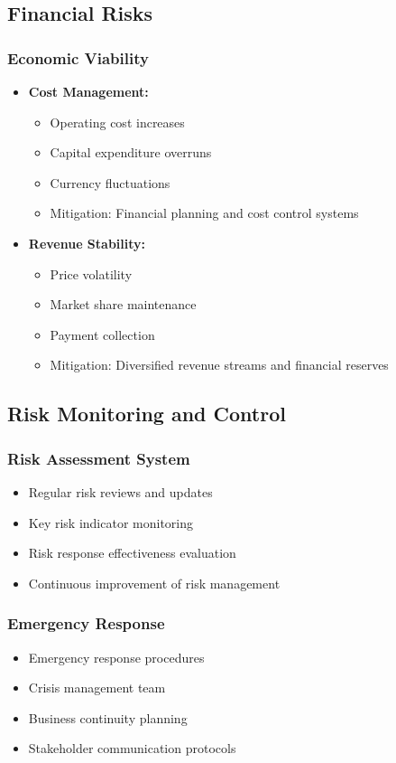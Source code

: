\subsection{Financial Risks}

\subsubsection{Economic Viability}
\begin{itemize}
    \item \textbf{Cost Management:}
    \begin{itemize}
        \item Operating cost increases
        \item Capital expenditure overruns
        \item Currency fluctuations
        \item Mitigation: Financial planning and cost control systems
    \end{itemize}
    
    \item \textbf{Revenue Stability:}
    \begin{itemize}
        \item Price volatility
        \item Market share maintenance
        \item Payment collection
        \item Mitigation: Diversified revenue streams and financial reserves
    \end{itemize}
\end{itemize}

\subsection{Risk Monitoring and Control}

\subsubsection{Risk Assessment System}
\begin{itemize}
    \item Regular risk reviews and updates
    \item Key risk indicator monitoring
    \item Risk response effectiveness evaluation
    \item Continuous improvement of risk management
\end{itemize}

\subsubsection{Emergency Response}
\begin{itemize}
    \item Emergency response procedures
    \item Crisis management team
    \item Business continuity planning
    \item Stakeholder communication protocols
\end{itemize}
